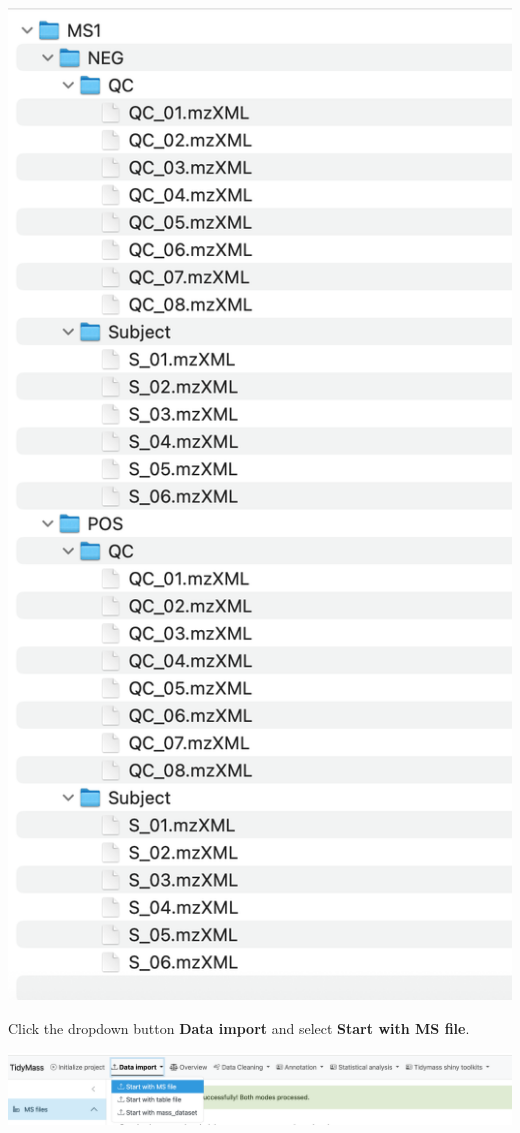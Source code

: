 \documentclass[
]{book}
\begin{document}
\includegraphics{figures/MS1_files.png}

Click the dropdown button \textbf{Data import} and select \textbf{Start with MS file}.

\includegraphics{figures/MS_start.png}
\end{document}

